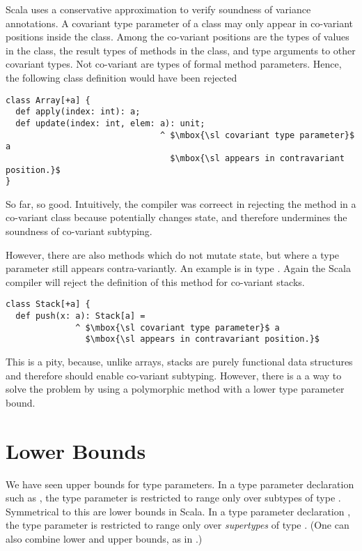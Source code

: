 Scala uses a conservative approximation to verify soundness of
variance annotations.  A covariant type parameter of a class may only
appear in co-variant positions inside the class.  Among the co-variant
positions are the types of values in the class, the result types of
methods in the class, and type arguments to other covariant types. Not
co-variant are types of formal method parameters. Hence, the following
class definition would have been rejected
\begin{lstlisting}
class Array[+a] {
  def apply(index: int): a;
  def update(index: int, elem: a): unit;
                               ^ $\mbox{\sl covariant type parameter}$ a
                                 $\mbox{\sl appears in contravariant position.}$
}
\end{lstlisting}
So far, so good. Intuitively, the compiler was correect in rejecting
the  method in a co-variant class because 
potentially changes state, and therefore undermines the soundness of
co-variant subtyping. 

However, there are also methods which do not mutate state, but where a
type parameter still appears contra-variantly. An example is
 in type . Again the Scala compiler will reject
the definition of this method for co-variant stacks.
\begin{lstlisting}
class Stack[+a] {
  def push(x: a): Stack[a] = 
              ^ $\mbox{\sl covariant type parameter}$ a
                $\mbox{\sl appears in contravariant position.}$
\end{lstlisting}
This is a pity, because, unlike arrays, stacks are purely functional data
structures and therefore should enable co-variant subtyping. However,
there is a a way to solve the problem by using a polymorphic method
with a lower type parameter bound.

\section{Lower Bounds}

We have seen upper bounds for type parameters. In a type parameter
declaration such as , the type parameter  is
restricted to range only over subtypes of type . Symmetrical
to this are lower bounds in Scala. In a type parameter declaration
, the type parameter  is restricted to range only
over {\em supertypes} of type . (One can also combine lower and
upper bounds, as in .)

